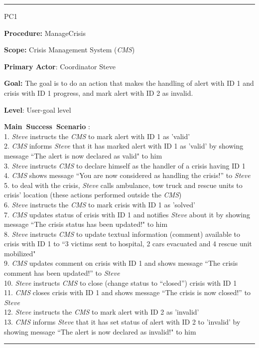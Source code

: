 \hrule
\begin{lyxlist}{PC1}
\small{
\item [\textbf{Procedure:}] ManageCrisis
\item [\textbf{Scope:}] Crisis Management System (\emph{CMS})
\item [\textbf{Primary Actor}:] Coordinator Steve
\item [\textbf{Goal:}] The goal is to do an action that makes the handling of
alert with ID 1 and crisis with ID 1 progress, and mark alert with ID 2 as
invalid.
\item [\textbf{Level}:] User-goal level
\item [\textbf{Main~Success~Scenario}]:\\
1. \emph{Steve} instructs the \emph{CMS} to mark alert with ID 1 as 'valid'\\
2. \emph{CMS} informs \emph{Steve} that it has marked alert with ID 1 as
'valid' by showing message ``The alert is now declared as valid" to him\\
3. \emph{Steve} instructs \emph{CMS} to declare himself as the handler of a
crisis having ID 1\\
4. \emph{CMS} shows message ``You are now considered as handling the crisis!''
to \emph{Steve}\\
5. to deal with the crisis, \emph{Steve} calls ambulance, tow truck and rescue
units to crisis' location (these actions performed outside the \emph{CMS})\\
6. \emph{Steve} instructs the \emph{CMS} to mark
crisis with ID 1 as 'solved'\\
7. \emph{CMS} updates status of crisis with ID 1 and notifies \emph{Steve}
about it by showing message ``The crisis status has been updated!" to him\\
8. \emph{Steve} instructs \emph{CMS} to update textual information (comment)
available to crisis with ID 1 to ``3 victims sent to hospital, 2 cars
evacuated and 4 rescue unit mobilized"\\
9. \emph{CMS} updates comment on crisis with ID 1 and shows message ``The
crisis comment has been updated!'' to \emph{Steve}\\
10. \emph{Steve} instructs \emph{CMS} to close (change status to ``closed'')
crisis with ID 1\\
11. \emph{CMS} closes crisis with ID 1 and shows message ``The crisis is now
closed!'' to \emph{Steve}\\
12. \emph{Steve} instructs the \emph{CMS} to mark alert with ID 2 as 'invalid'\\
13. \emph{CMS} informs \emph{Steve} that it has set status of alert with ID 2 to
'invalid' by showing message ``The alert is now declared as invalid!" to him\\
}

\end{lyxlist}
\hrule

